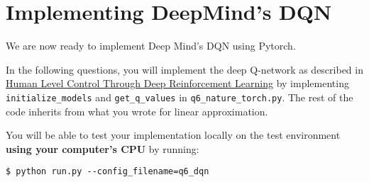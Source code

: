 \section{Implementing DeepMind's DQN}

We are now ready to implement Deep Mind's DQN using Pytorch.

In the following questions, you will implement the deep Q-network as described in \href{https://storage.googleapis.com/deepmind-media/dqn/DQNNaturePaper.pdf}{Human Level Control Through Deep Reinforcement Learning} by implementing \texttt{initialize\_models} and \texttt{get\_q\_values} in \texttt{q6\_nature\_torch.py}. The rest of the code inherits from what you wrote for linear approximation. 

You will be able to test your implementation locally on the test environment \textbf{using your computer's CPU}  by running:

\begin{lstlisting}
$ python run.py --config_filename=q6_dqn
\end{lstlisting} 

\begin{enumerate}[(a)]

	

	

	

\end{enumerate}